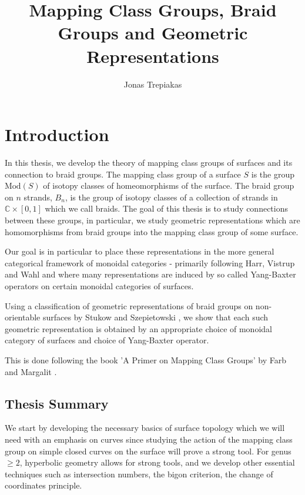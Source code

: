\documentclass[reqno]{amsart}
\title{Mapping Class Groups, Braid Groups and Geometric Representations}
\author{Jonas Trepiakas}
\theoremstyle{definition}
\theoremstyle{remark}
\newcommand{\Mod}{{\mathrm{Mod}}}
\begin{document}
\maketitle

\tableofcontents

\section{Introduction}

In this thesis, we develop the theory of mapping class groups
of surfaces and its connection to braid groups.
The mapping class group of a surface $S$
is the group $\Mod(S)$ of isotopy classes of homeomorphisms of
the surface. The braid group on $n$ strands,  $B_n$,
is the group of
isotopy classes of a collection of
strands in $\mathbb{C} \times \left[ 0,1 \right] $ which
we call braids. 
The goal of this thesis is to study connections
between these groups, in particular, we study
geometric representations which are homomorphisms
from braid groups into the mapping class group of some surface.

Our goal is in particular to place these representations in
the more general categorical framework of monoidal categories
- primarily
following Harr, Vistrup and Wahl \cite{Harr-Vistrup-Wahl} and
\cite{Wahl-Randal-Williams}
where many representations are induced by so called Yang-Baxter
operators on certain monoidal categories of surfaces.

Using a classification of geometric representations
of braid groups on non-orientable surfaces by 
Stukow and Szepietowski \cite{StSz}, we show that
each such geometric representation is obtained 
by an appropriate choice of monoidal category of surfaces
and choice of Yang-Baxter operator.






This is done following the book 'A Primer on Mapping Class Groups' by
Farb and Margalit \cite{Farb-Margalit}. 

\subsection{Thesis Summary} 
We start by
developing the necessary basics of surface topology which we will
need with an emphasis on curves since studying the
action of the mapping class group on simple closed curves
on the surface will prove a strong tool. For
genus $\ge 2$, hyperbolic geometry allows for strong tools, and
we develop other essential techniques such as intersection
numbers, the bigon criterion, the change of coordinates principle.
\end{document}
